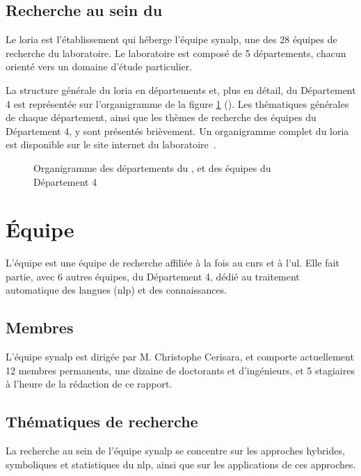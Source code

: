 \pagebreak
\subsection{Recherche au sein du }
Le \gls{loria} est l'établissement qui héberge l'équipe \gls{synalp}, une des 28 équipes de recherche du laboratoire. Le laboratoire est composé de 5 départements, chacun orienté vers un domaine d'étude particulier.

La structure générale du \gls{loria} en départements et, plus en détail, du Département 4 est représentée sur l'organigramme de la figure \ref{fig:dep_org} (). %
Les thématiques générales de chaque département, ainsi que les thèmes de recherche des équipes du Département 4, y sont présentés brièvement.
Un organigramme complet du \gls{loria} est disponible sur {le site internet du laboratoire~\autocite{org_loria}}.

\begin{figure}[h]
	\centering
	\scalebox{1}{}
	\caption{Organigramme des départements du , et des équipes du Département 4}
	\label{fig:dep_org}
\end{figure}

\pagebreak
\section{Équipe }
L'équipe  est une équipe de recherche affiliée à la fois au \gls{cnrs} et à l'\gls{ul}.
Elle fait partie, avec 6 autres équipes, du Département 4, dédié au traitement automatique des langues (\gls{nlp}) et des connaissances.

\subsection{Membres}
L'équipe \gls{synalp} est dirigée par M. Christophe Cerisara, et comporte actuellement 12 membres permanents, une dizaine de doctorants et d'ingénieurs, et 5 stagiaires à l'heure de la rédaction de ce rapport.

\subsection{Thématiques de recherche}
La recherche au sein de l'équipe \gls{synalp} se concentre sur les approches hybrides, symboliques et statistiques du \gls{nlp}, ainsi que sur les applications de ces approches.

